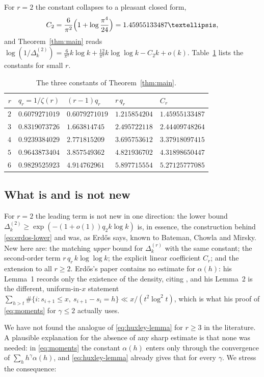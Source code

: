 \documentclass[10pt,a4paper]{amsart}
\numberwithin{equation}{section}
\begin{document}
For $r=2$ the constant collapses to a pleasant closed form,
\begin{equation}\label{eq:C2}
  C_2=\frac{6}{\pi^{2}}\Bigl(1+\log\frac{\pi^{4}}{24}\Bigr)=1.45955133487\ldots,
\end{equation}
and Theorem~\ref{thm:main} reads
$\log(1/\Delta^{(2)}_k)=\frac{6}{\pi^{2}}k\log k+\frac{12}{\pi^{2}}k\log\log k-C_2k+o(k)$.
Table~\ref{tab:Cr} lists the constants for small $r$.

\begin{table}[ht]
\caption{The three constants of Theorem~\ref{thm:main}.}
\label{tab:Cr}
\begin{tabular}{rllll}
\toprule
$r$ & $q_r=1/\zeta(r)$ & $(r-1)q_r$ & $r\,q_r$ & $C_r$\\
\midrule
$2$ & $0.6079271019$ & $0.6079271019$ & $1.215854204$ & $1.45955133487$\\
$3$ & $0.8319073726$ & $1.663814745$ & $2.495722118$ & $2.44409748264$\\
$4$ & $0.9239384029$ & $2.771815209$ & $3.695753612$ & $3.37918097415$\\
$5$ & $0.9643873404$ & $3.857549362$ & $4.821936702$ & $4.31898650447$\\
$6$ & $0.9829525923$ & $4.914762961$ & $5.897715554$ & $5.27125777085$\\
\bottomrule
\end{tabular}
\end{table}

\subsection*{What is and is not new}
For $r=2$ the leading term is not new in one direction: the lower bound
$\Delta^{(2)}_k\ge\exp(-(1+o(1))q_2k\log k)$ is, in essence, the construction behind
\eqref{eq:erdos-lower} and was, as Erd\H{o}s says, known to Bateman, Chowla and Mirsky.
New here are: the matching \emph{upper} bound for $\Delta^{(r)}_k$ with the same constant;
the second-order term $r\,q_r\,k\log\log k$; the explicit linear coefficient $C_r$; and the
extension to all $r\ge2$. Erd\H{o}s's paper contains no estimate for $\alpha(h)$: his
Lemma~1 records only the existence of the density, citing \cite{Mirsky}, and his Lemma~2 is
the different, uniform-in-$x$ statement
$\sum_{h>t}\#\{i:s_{i+1}\le x,\ s_{i+1}-s_i=h\}\ll x/(t^{2}\log^{2}t)$, which is what his
proof of \eqref{eq:moments} for $\gamma\le2$ actually uses.

We have not found the analogue of \eqref{eq:huxley-lemma} for $r\ge3$ in the literature.
A plausible explanation for the absence of any sharp estimate is that none was needed: in
\eqref{eq:moments} the constant $\alpha(h)$ enters only through the convergence of
$\sum_hh^{\gamma}\alpha(h)$, and \eqref{eq:huxley-lemma} already gives that for every
$\gamma$. We stress the consequence:
\end{document}
